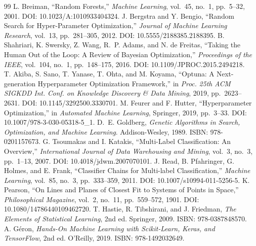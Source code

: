 \documentclass[11pt,a4paper,twocolumn]{article}
\begin{document}
\begin{thebibliography}{99}
\small
{} L. Breiman, ``Random Forests,'' \textit{Machine Learning}, vol.~45, no.~1,
pp.~5--32, 2001. DOI: 10.1023/A:1010933404324.
 J. Bergstra and Y. Bengio, ``Random Search for Hyper-Parameter Optimization,''
\textit{Journal of Machine Learning Research}, vol.~13, pp.~281--305, 2012. DOI: 10.5555/2188385.2188395.
 B. Shahriari, K. Swersky, Z. Wang, R.~P. Adams, and N. de Freitas, ``Taking the
Human Out of the Loop: A Review of Bayesian Optimization,'' \textit{Proceedings of the IEEE}, vol.~104,
no.~1, pp.~148--175, 2016. DOI: 10.1109/JPROC.2015.2494218.
 T. Akiba, S. Sano, T. Yanase, T. Ohta, and M. Koyama, ``Optuna: A Next-generation
Hyperparameter Optimization Framework,'' in \textit{Proc. 25th ACM SIGKDD Int. Conf. on Knowledge Discovery
\& Data Mining}, 2019, pp.~2623--2631. DOI: 10.1145/3292500.3330701.
 M. Feurer and F. Hutter, ``Hyperparameter Optimization,'' in \textit{Automated Machine
Learning}, Springer, 2019, pp.~3--33. DOI: 10.1007/978-3-030-05318-5\_1.
 D.~E. Goldberg, \textit{Genetic Algorithms in Search, Optimization, and Machine
Learning}. Addison-Wesley, 1989. ISBN: 978-0201157673.
 G. Tsoumakas and I. Katakis, ``Multi-Label Classification: An Overview,''
\textit{International Journal of Data Warehousing and Mining}, vol.~3, no.~3, pp.~1--13, 2007.
DOI: 10.4018/jdwm.2007070101.
 J. Read, B. Pfahringer, G. Holmes, and E. Frank, ``Classifier Chains for Multi-label
Classification,'' \textit{Machine Learning}, vol.~85, no.~3, pp.~333--359, 2011.
DOI: 10.1007/s10994-011-5256-5.
 K. Pearson, ``On Lines and Planes of Closest Fit to Systems of Points in Space,''
\textit{Philosophical Magazine}, vol.~2, no.~11, pp.~559--572, 1901. DOI: 10.1080/14786440109462720.
 T. Hastie, R. Tibshirani, and J. Friedman, \textit{The Elements of Statistical
Learning}, 2nd ed. Springer, 2009. ISBN: 978-0387848570.
 A. Géron, \textit{Hands-On Machine Learning with Scikit-Learn, Keras, and
TensorFlow}, 2nd ed. O'Reilly, 2019. ISBN: 978-1492032649.
\end{thebibliography}
\end{document}
